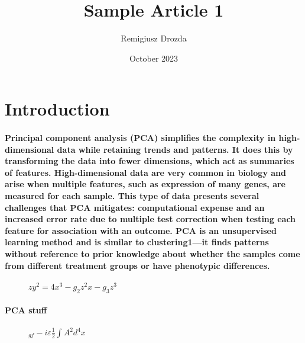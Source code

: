 \documentclass{article}
\title{Sample Article 1}
\author{Remigiusz Drozda}
\date{October 2023}
\begin{document}
\maketitle

\section{Introduction}
\paragraph{Principal component analysis (PCA) simplifies the complexity in high-dimensional data while retaining trends and patterns. It does this by transforming the data into fewer dimensions, which act as summaries of features. High-dimensional data are very common in biology and arise when multiple features, such as expression of many genes, are measured for each sample. This type of data presents several challenges that PCA mitigates: computational expense and an increased error rate due to multiple test correction when testing each feature for association with an outcome. PCA is an unsupervised learning method and is similar to clustering1—it finds patterns without reference to prior knowledge about whether the samples come from different treatment groups or have phenotypic differences.}

\begin{figure}[h]
\centering
    $z y ^ { 2 } = 4 x ^ { 3 } - g _ { 2 } z ^ { 2 } x - g _ { 3 } z ^ { 3 }$
\end{figure}
\paragraph{PCA stuff}
\begin{figure}[h]
\centering
    $_ { g f } - i \varepsilon \frac { 1 } { 2 } \int A ^ { 2 } d ^ { 4 } x$
\end{figure}
\end{document}
